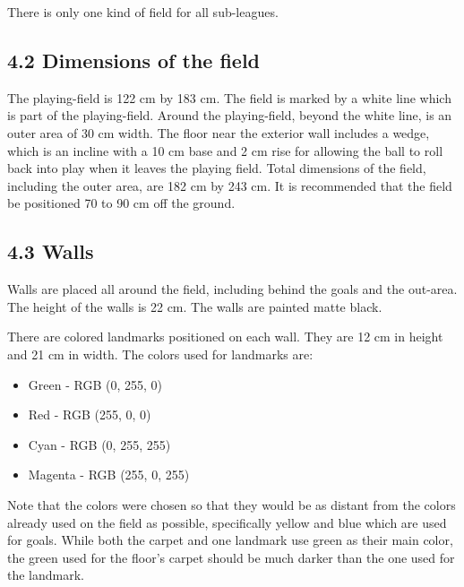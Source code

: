 \documentclass{article}
\begin{document}
There is only one kind of field for all sub-leagues. 

\subsection{4.2 Dimensions of the field \label{ref-030}}

The playing-field is 122 cm by 183 cm. The field is marked by a white line which is part of the playing-field. Around the playing-field, beyond the white line, is an outer area of 30 cm width. The floor near the exterior wall includes a wedge, which is an incline with a 10 cm base and \textcolor{color-5}{2} cm rise for allowing the ball to roll back into play when it leaves the playing field. Total dimensions of the field, including the outer area, are 182 cm by 243 cm. It is recommended that the field be positioned 70 to 90 cm off the ground. 

\subsection{4.3 Walls \label{ref-031}}

Walls are placed all around the field, including behind the goals and the out-area. The height of the walls is \textcolor{color-5}{22} cm. The walls are painted matte black.

\textcolor{color-5}{There are colored landmarks positioned on each wall. They are 12 cm in height and 21 cm in width. The colors used for landmarks are:}

\begin{itemize}
\item \textcolor{color-5}{Green - RGB (0, 255, 0)}

\item \textcolor{color-5}{Red - RGB (255, 0, 0)}

\item \textcolor{color-5}{Cyan - RGB (0, 255, 255)}

\item \textcolor{color-5}{Magenta - RGB (255, 0, 255)}

\end{itemize}
\textcolor{color-5}{Note that the colors were chosen so that they would be as distant from the colors already used on the field as possible, specifically yellow and blue which are used for goals. While both the carpet and one landmark use green as their main color, the green used for the floor's carpet should be much darker than the one used for the landmark.}
\end{document}
